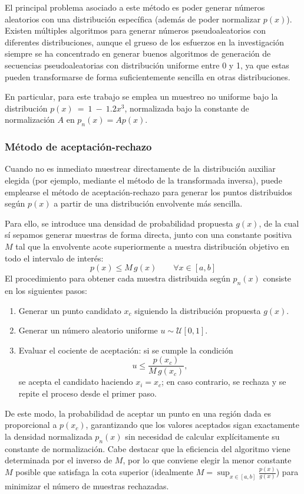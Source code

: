\documentclass[11pt, a4paper]{article}
\begin{document}
El principal problema asociado a este método es poder generar números aleatorios con una distribución específica (además de poder normalizar $p(x)$). Existen múltiples algoritmos para generar números pseudoaleatorios con diferentes distribuciones, aunque el grueso de los esfuerzos en la investigación siempre se ha concentrado en generar buenos algoritmos de generación de secuencias pseudoaleatorias con distribución uniforme entre 0 y 1, ya que estas pueden transformarse de forma suficientemente sencilla en otras distribuciones.

En particular, para este trabajo se emplea un muestreo no uniforme bajo la distribución $p(x)~=~1~-~1.2x^3$, normalizada bajo la constante de normalización $A$ en $p_n(x) = A p(x)$.

\subsubsection{Método de aceptación-rechazo}
Cuando no es inmediato muestrear directamente de la distribución auxiliar elegida (por ejemplo, mediante el método de la transformada inversa), puede emplearse el método de aceptación-rechazo para generar los puntos distribuidos según $p(x)$ a partir de una distribución envolvente más sencilla.

Para ello, se introduce una densidad de probabilidad propuesta $g(x)$, de la cual sí sepamos generar muestras de forma directa, junto con una constante positiva $M$ tal que la envolvente acote superiormente a nuestra distribución objetivo en todo el intervalo de interés:
\begin{equation}
    p(x) \leq M \, g(x) \qquad \forall x \in [a,b]
\end{equation}
El procedimiento para obtener cada muestra distribuida según $p_n(x)$ consiste en los siguientes pasos:
\begin{enumerate}
    \item Generar un punto candidato $x_c$ siguiendo la distribución propuesta $g(x)$.
    \item Generar un número aleatorio uniforme $u \sim \mathcal{U}[0,1]$.
    \item Evaluar el cociente de aceptación: si se cumple la condición
    \begin{equation}
        u \leq \frac{p(x_c)}{M \, g(x_c)},
    \end{equation}
    se acepta el candidato haciendo $x_i = x_c$; en caso contrario, se rechaza y se repite el proceso desde el primer paso.
\end{enumerate}
De este modo, la probabilidad de aceptar un punto en una región dada es proporcional a $p(x_c)$, garantizando que los valores aceptados sigan exactamente la densidad normalizada $p_n(x)$ sin necesidad de calcular explícitamente su constante de normalización. Cabe destacar que la eficiencia del algoritmo viene determinada por el inverso de $M$, por lo que conviene elegir la menor constante $M$ posible que satisfaga la cota superior (idealmente $M = \sup_{x \in [a,b]} \frac{p(x)}{g(x)}$) para minimizar el número de muestras rechazadas.
\end{document}
